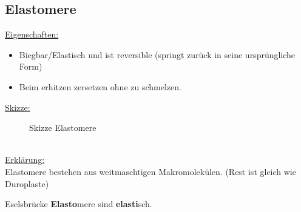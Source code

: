 \documentclass[../main.tex]{subfiles}
\begin{document}
\subsection{Elastomere}
\underline{Eigenschaften:}
\begin{itemize}
    \item Biegbar/Elastisch und ist reversible (springt zurück in seine ursprüngliche Form)
    \item Beim erhitzen zersetzen ohne zu schmelzen.
\end{itemize}
\newpage
\underline{Skizze:}
\begin{figure}[ht]
    \centering
    \caption{Skizze Elastomere}
    \label{fig:skizze_elastomere}
\end{figure}
%
\\
\underline{Erklärung:}
\\
Elastomere bestehen aus weitmaschtigen Makromolekülen. (Rest ist gleich wie Duroplaste)
\begin{merke}{Eselsbrücke}
    \textbf{Elasto}mere sind \textbf{elasti}sch.
\end{merke}
%
%
\end{document}
